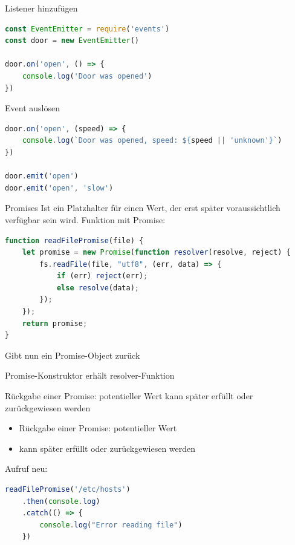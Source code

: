 \begin{examplecode}{Listener hinzufügen}
\begin{lstlisting}[language=JavaScript, style=basesmol]
const EventEmitter = require('events')
const door = new EventEmitter()

door.on('open', () => {
    console.log('Door was opened')
})
\end{lstlisting}
\end{examplecode}

\begin{examplecode}{Event auslösen}
\begin{lstlisting}[language=JavaScript, style=basesmol]
door.on('open', (speed) => {
    console.log(`Door was opened, speed: ${speed || 'unknown'}`)
})

door.emit('open')
door.emit('open', 'slow')
\end{lstlisting}
\end{examplecode}

\begin{definition}{Promises}
Ist ein Platzhalter für einen Wert, der erst später voraussichtlich verfügbar sein wird.
Funktion mit Promise:
\begin{lstlisting}[language=JavaScript, style=basesmol]
function readFilePromise(file) {
    let promise = new Promise(function resolver(resolve, reject) {
        fs.readFile(file, "utf8", (err, data) => {
            if (err) reject(err);
            else resolve(data);
        });
    });
    return promise;
}
\end{lstlisting}
Gibt nun ein Promise-Object zurück
\end{definition}

\begin{concept}{Promise-Konstruktor erhält resolver-Funktion}

Rückgabe einer Promise: potentieller Wert kann später erfüllt oder zurückgewiesen werden
\begin{itemize}
  \item Rückgabe einer Promise: potentieller Wert
  \item kann später erfüllt oder zurückgewiesen werden
\end{itemize}
Aufruf neu:
\begin{lstlisting}[language=JavaScript, style=basesmol]
readFilePromise('/etc/hosts')
    .then(console.log)
    .catch(() => {
        console.log("Error reading file")
    })
\end{lstlisting}
\end{concept}

